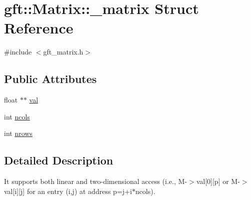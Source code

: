 \hypertarget{structgft_1_1Matrix_1_1__matrix}{\section{gft\-:\-:Matrix\-:\-:\-\_\-matrix Struct Reference}
\label{structgft_1_1Matrix_1_1__matrix}
}


{\ttfamily \#include $<$gft\-\_\-matrix.\-h$>$}

\subsection*{Public Attributes}
\begin{DoxyCompactItemize}
\item 
float $\ast$$\ast$ \hyperlink{structgft_1_1Matrix_1_1__matrix_a8df72738edce4750dd107aa59c7c22eb}{val}
\item 
int \hyperlink{structgft_1_1Matrix_1_1__matrix_a4b61985e3d0ec2950798d37bfcec916a}{ncols}
\item 
int \hyperlink{structgft_1_1Matrix_1_1__matrix_a0c4817339b3dd2b842cb2fd66df70bcc}{nrows}
\end{DoxyCompactItemize}


\subsection{Detailed Description}
It supports both linear and two-\/dimensional access (i.\-e., M-\/$>$val\mbox{[}0\mbox{]}\mbox{[}p\mbox{]} or M-\/$>$val\mbox{[}i\mbox{]}\mbox{[}j\mbox{]} for an entry (i,j) at address p=j+i$\ast$ncols). 


